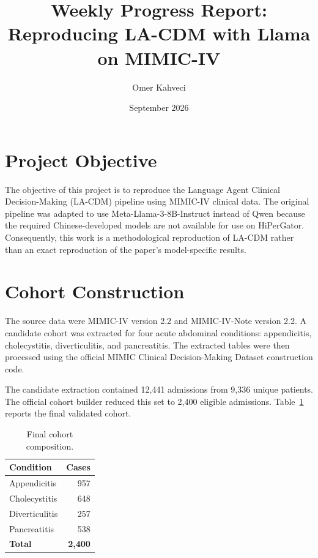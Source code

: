 \documentclass[11pt]{article}
\title{Weekly Progress Report: Reproducing LA-CDM with Llama on MIMIC-IV}
\author{Omer Kahveci}
\date{September 2026}
\begin{document}
\maketitle

\section{Project Objective}

The objective of this project is to reproduce the Language Agent Clinical
Decision-Making (LA-CDM) pipeline using MIMIC-IV clinical data. The original
pipeline was adapted to use Meta-Llama-3-8B-Instruct instead of Qwen because
the required Chinese-developed models are not available for use on HiPerGator.
Consequently, this work is a methodological reproduction of LA-CDM rather than
an exact reproduction of the paper's model-specific results.

\section{Cohort Construction}

The source data were MIMIC-IV version 2.2 and MIMIC-IV-Note version 2.2. A
candidate cohort was extracted for four acute abdominal conditions:
appendicitis, cholecystitis, diverticulitis, and pancreatitis. The extracted
tables were then processed using the official MIMIC Clinical Decision-Making
Dataset construction code.

The candidate extraction contained 12,441 admissions from 9,336 unique
patients. The official cohort builder reduced this set to 2,400 eligible
admissions. Table~\ref{tab:cohort} reports the final validated cohort.

\begin{table}[ht]
    \centering
    \caption{Final cohort composition.}
    \label{tab:cohort}
    \begin{tabular}{lr}
        \toprule
        Condition & Cases \\
        \midrule
        Appendicitis & 957 \\
        Cholecystitis & 648 \\
        Diverticulitis & 257 \\
        Pancreatitis & 538 \\
        \midrule
        \textbf{Total} & \textbf{2,400} \\
        \bottomrule
    \end{tabular}
\end{table}
\end{document}
